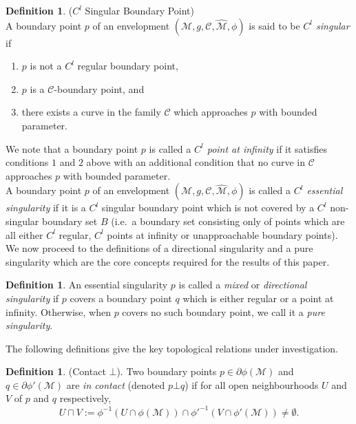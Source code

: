 \documentclass[pdflatex,sn-mathphys-num]{sn-jnl}
\theoremstyle{definition}
\newtheorem{defn}[theorem]{Definition}
\begin{document}
\begin{defn}($C^l$ Singular Boundary Point)\\
A boundary point $p$ of an envelopment $(\mathcal{M},g,\mathcal{C},\hat{\mathcal{M}},\phi)$ is said to be \textit{$C^l$ singular} if
\begin{enumerate}
    \item $p$ is not  a $C^l$ regular boundary point,
    \item $p$ is a $\mathcal{C}$-boundary point, and
    \item there exists a curve in the family $\mathcal{C}$ which approaches $p$ with bounded parameter.
\end{enumerate}
\end{defn}

We note that a boundary point $p$ is called a \emph{$C^l$ point at infinity} if it satisfies conditions $1$ and $2$ above with an additional condition that no curve in $\mathcal{C}$ approaches $p$ with bounded parameter.\\

A boundary point $p$ of an envelopment $(\mathcal{M},g,\mathcal{C},\hat{\mathcal{M}},\phi)$ is called a \emph{$C^l$ essential singularity} if it is a $C^l$ singular boundary point which is not covered by a $C^l$ non-singular boundary set $B$ (i.e.\ a boundary set consisting only of points which are all either $C^l$ regular, $C^l$ points at infinity or unapproachable boundary points).\\

We now proceed to the definitions of a directional singularity and a pure singularity which are the core concepts required for the results of this paper.\\

\begin{defn}
An essential singularity $p$ is called a \textit{mixed} or \textit{directional singularity} if $p$ covers a boundary point $q$ which is either regular or a point at infinity. Otherwise, when $p$ covers no such boundary point, we call it a \textit{pure singularity}.
\end{defn}

The following definitions give the key topological relations under investigation.

\begin{defn}(Contact $\bot$).
    Two boundary points $p \in \partial\phi(\mathcal{M})$ and $q \in \partial\phi'(\mathcal{M})$ are \emph{in contact} (denoted $p \bot q$) if for all open neighbourhoods $U$ and $V$ of $p$ and $q$ respectively,
    \begin{equation}\label{contact}
        U \sqcap V := \phi^{-1}(U \cap \phi(\mathcal{M})) \cap \phi'^{-1}(V \cap \phi'(\mathcal{M})) \neq \emptyset  .
    \end{equation}
\end{defn}
\end{document}

